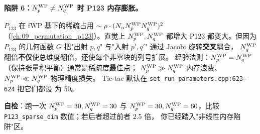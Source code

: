 \begin{pitfallbox}[label={box:ch05-pitfall-Np-vs-Nq}]
\textbf{陷阱 6：\({N_{p}^{\text{WP}}} \neq {N_{q}^{\text{WP}}}\) 时 P123 内存膨胀。}

\(P_{123}\) 在 fWP 基下的稀疏占用 \(\sim \rho \cdot (N_\alpha {N_{p}^{\text{WP}}} {N_{q}^{\text{WP}}})^2\)
（\cref{ch:09_permutation_p123}）。直觉上 \({N_{p}^{\text{WP}}}, {N_{q}^{\text{WP}}}\) 都增大 P123
都变大。但因为\(P_{123}\) 的几何函数 \(G\) 把"出射 \(p, q\)" 与"入射
\(p', q'\)" 通过 Jacobi 旋转\textbf{交叉}耦合，
\({N_{q}^{\text{WP}}}\) 翻倍\textbf{不仅}使总维度翻倍，还使每个非零块的列号扩展。
经验法则：\({N_{p}^{\text{WP}}} = {N_{q}^{\text{WP}}}\)（保持张量积平衡）通常是稀疏度最佳点；
\({N_{p}^{\text{WP}}} \gg {N_{q}^{\text{WP}}}\) 内存浪费、\({N_{p}^{\text{WP}}} \ll {N_{q}^{\text{WP}}}\) 物理精度损失。
Tic-tac 默认在 \texttt{set\_run\_parameters.cpp:623--624} 把它们都设
为 50。

\textbf{自检}：跑一次 \({N_{p}^{\text{WP}}} = 30, {N_{q}^{\text{WP}}} = 30\) 与 \({N_{p}^{\text{WP}}} = 30, {N_{q}^{\text{WP}}}
= 60\)，比较 \texttt{P123\_sparse\_dim} 数值；若后者超过前者 \(2.5\) 倍，
你已经踏入"非线性内存陷阱"区。
\end{pitfallbox}
